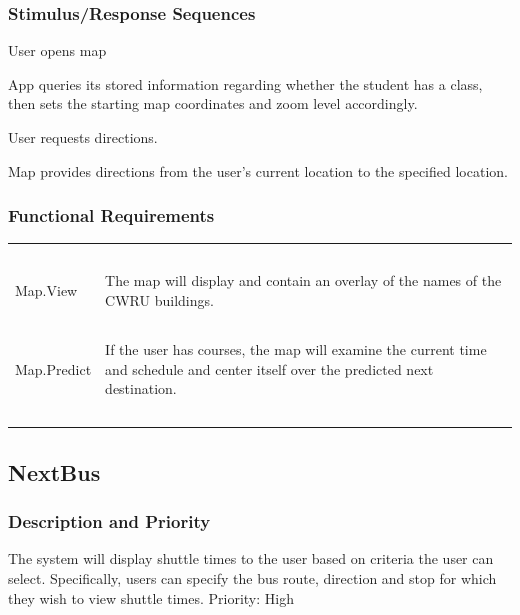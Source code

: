 \documentclass[pdftex,12pt,letter]{article}
\begin{document}
\subsubsection{Stimulus/Response Sequences}
\begin{description}\itemsep1pt
\item[Stimulus:] User opens map
\item[Response:] App queries its stored information regarding whether the student has a class, then sets the starting map coordinates and zoom level accordingly.
\item[Stimulus:] User requests directions.
\item[Response:] Map provides directions from the user's current location to the specified location.
\end{description}
\subsubsection{Functional Requirements}
\begin{table}[!h]
\begin{tabularx}{\textwidth }[t]{|l Y|}
\hline
~&~\\
Map.View & The map will display and contain an overlay of the names of the CWRU buildings. \\ 
~&~\\
Map.Predict & If the user has courses, the map will examine the current time and schedule and center itself over the predicted next destination. \\
~&~\\
\hline
\end{tabularx}
\end{table}
\subsection{NextBus}
\subsubsection{Description and Priority}
The system will display shuttle times to the user based on criteria the user can select. Specifically, users can specify the bus route, direction and stop for which they wish to view shuttle times. Priority: High
\end{document}
